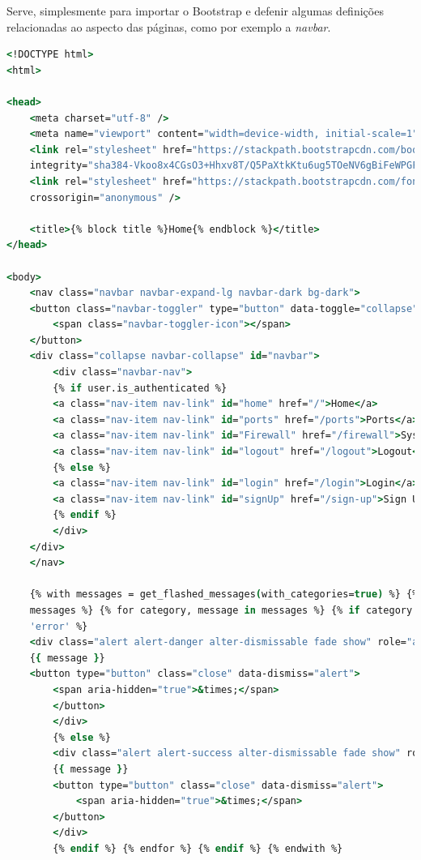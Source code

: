 Serve, simplesmente para importar o Bootstrap e defenir algumas definições
relacionadas ao aspecto das páginas, como por exemplo a \textit{navbar}.

\begin{lstlisting}[language=csh, caption={Ficheiro base.html}]
<!DOCTYPE html>
<html>

<head>
    <meta charset="utf-8" />
    <meta name="viewport" content="width=device-width, initial-scale=1" />
    <link rel="stylesheet" href="https://stackpath.bootstrapcdn.com/bootstrap/4.4.1/css/bootstrap.min.css"
    integrity="sha384-Vkoo8x4CGsO3+Hhxv8T/Q5PaXtkKtu6ug5TOeNV6gBiFeWPGFN9MuhOf23Q9Ifjh" crossorigin="anonymous" />
    <link rel="stylesheet" href="https://stackpath.bootstrapcdn.com/font-awesome/4.7.0/css/font-awesome.min.css"
    crossorigin="anonymous" />

    <title>{% block title %}Home{% endblock %}</title>
</head>

<body>
    <nav class="navbar navbar-expand-lg navbar-dark bg-dark">
    <button class="navbar-toggler" type="button" data-toggle="collapse" data-target="#navbar">
        <span class="navbar-toggler-icon"></span>
    </button>
    <div class="collapse navbar-collapse" id="navbar">
        <div class="navbar-nav">
        {% if user.is_authenticated %}
        <a class="nav-item nav-link" id="home" href="/">Home</a>
        <a class="nav-item nav-link" id="ports" href="/ports">Ports</a>
        <a class="nav-item nav-link" id="Firewall" href="/firewall">System Firewall</a>
        <a class="nav-item nav-link" id="logout" href="/logout">Logout</a>
        {% else %}
        <a class="nav-item nav-link" id="login" href="/login">Login</a>
        <a class="nav-item nav-link" id="signUp" href="/sign-up">Sign Up</a>
        {% endif %}
        </div>
    </div>
    </nav>

    {% with messages = get_flashed_messages(with_categories=true) %} {% if
    messages %} {% for category, message in messages %} {% if category ==
    'error' %}
    <div class="alert alert-danger alter-dismissable fade show" role="alert">
    {{ message }}
    <button type="button" class="close" data-dismiss="alert">
        <span aria-hidden="true">&times;</span>
        </button>
        </div>
        {% else %}
        <div class="alert alert-success alter-dismissable fade show" role="alert">
        {{ message }}
        <button type="button" class="close" data-dismiss="alert">
            <span aria-hidden="true">&times;</span>
        </button>
        </div>
        {% endif %} {% endfor %} {% endif %} {% endwith %}
    

\end{lstlisting}

